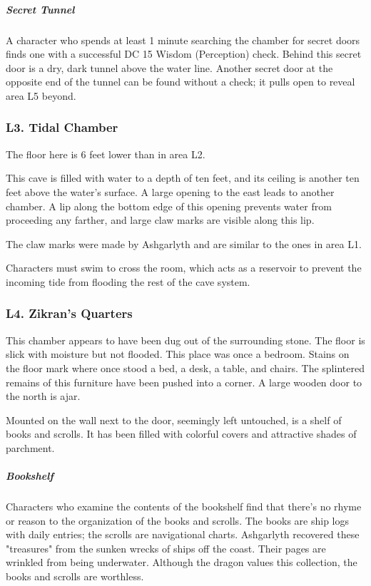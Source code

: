 \documentclass[10pt,a4paper,twoside,bg=print,twocolumn,openany,nodeprecatedcode]{dndbook}
\begin{document}
\subparagraph{Secret Tunnel}
A character who spends at least 1 minute searching the chamber for secret doors finds one with a successful DC 15 Wisdom (Perception) check. Behind this secret door is a dry, dark tunnel above the water line. Another secret door at the opposite end of the tunnel can be found without a check; it pulls open to reveal area L5 beyond.

\subsubsection{L3. Tidal Chamber}
The floor here is 6 feet lower than in area L2.

\begin{DndReadAloud}{}
This cave is filled with water to a depth of ten feet, and its ceiling is another ten feet above the water's surface. A large opening to the east leads to another chamber. A lip along the bottom edge of this opening prevents water from proceeding any farther, and large claw marks are visible along this lip.

\end{DndReadAloud}

The claw marks were made by Ashgarlyth and are similar to the ones in area L1.

Characters must swim to cross the room, which acts as a reservoir to prevent the incoming tide from flooding the rest of the cave system.

\subsubsection{L4. Zikran's Quarters}
\begin{DndReadAloud}{}
This chamber appears to have been dug out of the surrounding stone. The floor is slick with moisture but not flooded. This place was once a bedroom. Stains on the floor mark where once stood a bed, a desk, a table, and chairs. The splintered remains of this furniture have been pushed into a corner. A large wooden door to the north is ajar.

Mounted on the wall next to the door, seemingly left untouched, is a shelf of books and scrolls. It has been filled with colorful covers and attractive shades of parchment.

\end{DndReadAloud}

\subparagraph{Bookshelf}
Characters who examine the contents of the bookshelf find that there's no rhyme or reason to the organization of the books and scrolls. The books are ship logs with daily entries; the scrolls are navigational charts. Ashgarlyth recovered these "treasures" from the sunken wrecks of ships off the coast. Their pages are wrinkled from being underwater. Although the dragon values this collection, the books and scrolls are worthless.
\end{document}
